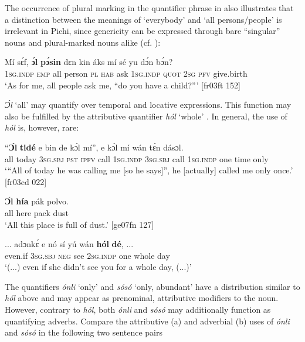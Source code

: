 The occurrence of plural marking in the quantifier phrase in  also illustrates that a distinction between the meanings of ‘everybody’ and ‘all persons/people’ is irrelevant in Pichi, since genericity can be expressed through bare “singular” nouns and plural-marked nouns alike (cf. ):



\ea%
    \label{ex:key:263}
    \gll Mí    sɛ́f,  \textbf{ɔ́l}  \textbf{pɔ́sin}  dɛn  kin  áks  mí    sé    yu  dɔ́n  bɔ́n?\\
\textsc{1sg.indp}  \textsc{emp}  all  person  \textsc{pl}  \textsc{hab}  ask  \textsc{1sg.indp}  \textsc{quot}  \textsc{2sg}  \textsc{pfv}  give.birth\\

\glt ‘As for me, all people ask me, “do you have a child?”’ [fr03ft 152]
\z

\textit{Ɔ́l} ‘all’ may quantify over temporal  and locative  expressions. This function may also be fulfilled by the attributive quantifier \textit{hól} ‘whole’ . In general, the use of \textit{hól} is, however, rare: 


\ea%
    \label{ex:key:264}
    \gll “\textbf{Ɔ́l}  \textbf{tidé}    e    bin  de  kɔ́l  mí”,    e    kɔ́l  mí
wán    tɛ́n    dásɔl.\\
\phantom{“}all  today  \textsc{3sg.sbj}  \textsc{pst}  \textsc{ipfv}  call  \textsc{1sg.indp}  \textsc{3sg.sbj}  call  \textsc{1sg.indp}
one    time    only\\

\glt ‘“All of today he was calling me [so he says]”, he [actually] called me only 
once.’ [fr03cd 022]
\z


\ea%
    \label{ex:key:265}
    \gll \textbf{Ɔ́l} \textbf{  hía}    pák  polvo.\\
all  here    pack  dust\\

\glt ‘All this place is full of dust.’ [ge07fn 127]
\z


\ea%
    \label{ex:key:266}
    \gll \op...\cp{}  adɔnkɛ́  e    nó  sí  yú    wán    \textbf{hól}    \textbf{dé},  \op...\cp{}\\
 {} even.if  \textsc{3sg.sbj}  \textsc{neg}  see  \textsc{2sg.indp}  one    whole  day  \\

\glt ‘(...) even if she didn’t see you for a whole day, (...)’
\z

The quantifiers \textit{ónli} ‘only’ and \textit{sósó} ‘only, abundant’ have a distribution similar to \textit{hól} above and may appear as prenominal, attributive modifiers to the noun. However, contrary to \textit{hól}, both \textit{ónli} and \textit{sósó} may additionally function as quantifying adverbs. Compare the attributive (a) and adverbial (b) uses of \textit{ónli}  and \textit{sósó}  in the following two sentence pairs\textstyleannotationreference{:} 


